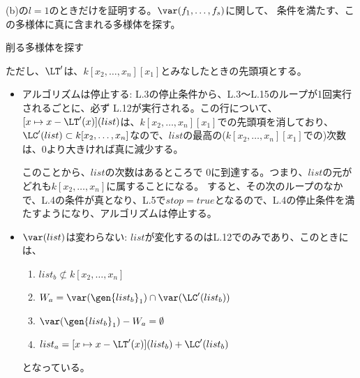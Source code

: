 \begin{myproof}
  (b)の$l=1$のときだけを証明する。$\var(f_1,\dots,f_s)$に関して、
  条件を満たす、この多様体に真に含まれる多様体を探す。
  \begin{algorithm}[H]
    \caption{削る多様体を探す}
    \begin{algorithmic}[1]
      \ELSE{}
        \ELSE{}
        \ENDIF{}
      \ENDIF{}
      \ENDWHILE{}
    \end{algorithmic}
  \end{algorithm}
  ただし、$\LT'$は、$k[x_2,\dots,x_n][x_1]$とみなしたときの先頭項とする。
  \begin{itemize}
    \item アルゴリズムは停止する:
    L.3の停止条件から、L.3～L.15のループが1回実行されるごとに、必ず
    L.12が実行される。この行について、
    $[x\mapsto x-\LT'(x)](list)$は、$k[x_2,\dots,x_n][x_1]$での先頭項を消しており、
    $\LC'(list)\subset k[x_2,\dots,x_n]$なので、$list$の最高の($k[x_2,\dots,x_n][x_1]$での)次数は、$0$より大きければ真に減少する。

    このことから、$list$の次数はあるところで
    $0$に到達する。つまり、$list$の元がどれも$k[x_2,\dots,x_n]$に属することになる。
    すると、その次のループのなかで、L.4の条件が真となり、L.5で$stop = true$となるので、L.4の停止条件を満たすようになり、アルゴリズムは停止する。
    \item $\var(list)$は変わらない:
    $list$が変化するのはL.12でのみであり、このときには、
    \begin{enumerate}[label=(\alph*)]
      \item  $list_b \not\subset k[x_2,\dots,x_n]$
      \item $W_a = \var(\gen{list_b}_1)\cap \var(\LC'(list_b))$
      \item $\var(\gen{list_b}_1) - W_a = \emptyset$
      \item $list_a = [x\mapsto x-\LT'(x)](list_b) + \LC'(list_b)$
    \end{enumerate}
    となっている。


\end{itemize}
\end{myproof}
